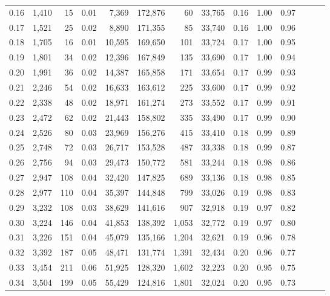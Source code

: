 \begin{tabular}{rrrrrrrrrrrrrr}
0.16 &  1,410 &   15 &  0.01 &    7,369 &  172,876 &      60 &  33,765 &  0.16 &  1.00 &      0.97 \\
0.17 &  1,521 &   25 &  0.02 &    8,890 &  171,355 &      85 &  33,740 &  0.16 &  1.00 &      0.96 \\
0.18 &  1,705 &   16 &  0.01 &   10,595 &  169,650 &     101 &  33,724 &  0.17 &  1.00 &      0.95 \\
0.19 &  1,801 &   34 &  0.02 &   12,396 &  167,849 &     135 &  33,690 &  0.17 &  1.00 &      0.94 \\
0.20 &  1,991 &   36 &  0.02 &   14,387 &  165,858 &     171 &  33,654 &  0.17 &  0.99 &      0.93 \\
0.21 &  2,246 &   54 &  0.02 &   16,633 &  163,612 &     225 &  33,600 &  0.17 &  0.99 &      0.92 \\
0.22 &  2,338 &   48 &  0.02 &   18,971 &  161,274 &     273 &  33,552 &  0.17 &  0.99 &      0.91 \\
0.23 &  2,472 &   62 &  0.02 &   21,443 &  158,802 &     335 &  33,490 &  0.17 &  0.99 &      0.90 \\
0.24 &  2,526 &   80 &  0.03 &   23,969 &  156,276 &     415 &  33,410 &  0.18 &  0.99 &      0.89 \\
0.25 &  2,748 &   72 &  0.03 &   26,717 &  153,528 &     487 &  33,338 &  0.18 &  0.99 &      0.87 \\
0.26 &  2,756 &   94 &  0.03 &   29,473 &  150,772 &     581 &  33,244 &  0.18 &  0.98 &      0.86 \\
0.27 &  2,947 &  108 &  0.04 &   32,420 &  147,825 &     689 &  33,136 &  0.18 &  0.98 &      0.85 \\
0.28 &  2,977 &  110 &  0.04 &   35,397 &  144,848 &     799 &  33,026 &  0.19 &  0.98 &      0.83 \\
0.29 &  3,232 &  108 &  0.03 &   38,629 &  141,616 &     907 &  32,918 &  0.19 &  0.97 &      0.82 \\
0.30 &  3,224 &  146 &  0.04 &   41,853 &  138,392 &   1,053 &  32,772 &  0.19 &  0.97 &      0.80 \\
0.31 &  3,226 &  151 &  0.04 &   45,079 &  135,166 &   1,204 &  32,621 &  0.19 &  0.96 &      0.78 \\
0.32 &  3,392 &  187 &  0.05 &   48,471 &  131,774 &   1,391 &  32,434 &  0.20 &  0.96 &      0.77 \\
0.33 &  3,454 &  211 &  0.06 &   51,925 &  128,320 &   1,602 &  32,223 &  0.20 &  0.95 &      0.75 \\
0.34 &  3,504 &  199 &  0.05 &   55,429 &  124,816 &   1,801 &  32,024 &  0.20 &  0.95 &      0.73 \\

\end{tabular}
